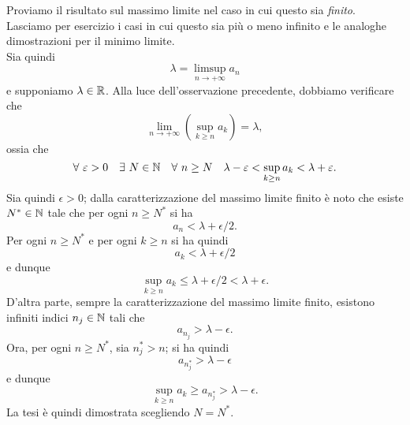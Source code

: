 \begin{demonstrationwt}
Proviamo il risultato sul massimo limite nel caso in cui questo sia \textit{finito}. Lasciamo per esercizio i casi in cui questo sia più o meno infinito e le analoghe dimostrazioni per il minimo limite.\\
Sia quindi 
\begin{equation*}
	\lambda = \limsup_{n\to +\infty} a_n
\end{equation*}
e supponiamo $\lambda \in \mathbb{R}$. Alla luce dell'osservazione precedente, dobbiamo verificare che 
\begin{equation*}
	\lim_{n\to +\infty} \left( \sup_{k\geq n} a_k\right) = \lambda,
\end{equation*}
ossia che 
\begin{equation*}
	\forall \ \varepsilon >0 \quad \exists \ N\in \mathbb{N}\quad \forall \ n\geq N \quad \lambda -\varepsilon < \sup_{k\geq n} a_k <\lambda +\varepsilon.
\end{equation*}
Sia quindi $\epsilon >0$; dalla caratterizzazione del massimo limite finito è noto che esiste $N^{\ast}\in \mathbb{N}$ tale che per ogni $n\geq N^{\ast}$ si ha 
\begin{equation*}
	a_n < \lambda +\epsilon/2.
\end{equation*}
Per ogni $n \geq N^{\ast}$ e per ogni $k\geq n$ si ha quindi
\begin{equation*}
	a_k < \lambda +\epsilon/2
\end{equation*}
e dunque
\begin{equation*}
	\sup_{k\geq n} a_k \leq \lambda +\epsilon/2 < \lambda +\epsilon.
\end{equation*}
D'altra parte, sempre la caratterizzazione del massimo limite finito, esistono infiniti indici $n_j\in \mathbb{N}$ tali che
\begin{equation*}
	a_{n_j} > \lambda -\epsilon.
\end{equation*}
Ora, per ogni $n\geq N^{\ast}$, sia $n^{\ast}_j>n$; si ha quindi
\begin{equation*}
	a_{n^{\ast}_j} > \lambda -\epsilon
\end{equation*}
e dunque
\begin{equation*}
	\sup_{k\geq n} a_{k} \geq a_{n^{\ast}_j}  > \lambda -\epsilon.
\end{equation*}
La tesi è quindi dimostrata scegliendo $N=N^{\ast}$.
\end{demonstrationwt}

